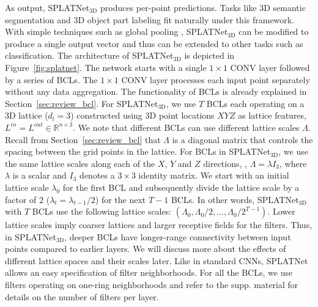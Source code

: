 \documentclass[10pt,twocolumn,letterpaper]{article}
\def\modelthree{SPLATNet$_{\text{3D}}$\xspace}
\begin{document}
As output, SPLATNet$_{\text{3D}}$ produces per-point predictions. Tasks like 3D semantic segmentation and 
3D object part labeling fit naturally under this framework. 
With simple techniques such as global pooling \cite{qi2017pointnet}, SPLATNet$_{\text{3D}}$ can be modified to 
produce a single output vector and thus can be extended to other tasks such as classification.
The architecture of SPLATNet$_{\text{3D}}$ is depicted in Figure~\ref{fig:splatnet}. The network starts with a single $1\times1$ CONV layer followed by a series of BCLs. The $1\times1$ CONV layer processes
each input point separately without any data aggregation. The functionality of BCLs is already explained
in Section~\ref{sec:review_bcl}. For SPLATNet$_{\text{3D}}$, we use $T$ BCLs each operating on
a 3D lattice ($d_l=3$) constructed using 
3D point locations $XYZ$ as lattice features,
$L^{in} = L^{out} \in \mathbb{R}^{n \times 3}$. 
We note that different BCLs can use different lattice scales $\Lambda$.
Recall from Section~\ref{sec:review_bcl} that $\Lambda$ is a diagonal matrix that controls the spacing between the grid points in the lattice. For BCLs in \modelthree, we use the same lattice scales along each of the $X$, $Y$ and $Z$ directions, \ie, $\Lambda = \lambda I_3$, where $\lambda$ is a scalar and $I_3$ denotes a $3\times 3$ identity matrix.
We start with an initial lattice scale $\lambda_0$ for the first BCL and subsequently divide the lattice scale by a factor of 2 ($\lambda_t = \lambda_{t-1} / 2$) 
for the next $T-1$ BCLs. 
In other words, \modelthree with $T$ BCLs use the following lattice scales: $(\Lambda_0, \Lambda_0/2, \dots, \Lambda_0/2^{T-1})$.
Lower lattice scales imply coarser lattices and larger receptive fields for the filters. 
Thus, in SPLATNet$_{\text{3D}}$, deeper BCLs have longer-range connectivity between input points compared 
to earlier layers. We will discuss more about the effects of different lattice spaces and their scales later.
Like in standard CNNs, SPLATNet allows an easy specification of filter neighborhoods.
For all the BCLs, we use filters operating on 
one-ring neighborhoods
and refer to the supp. material
for details on the number of filters per layer.
\end{document}
